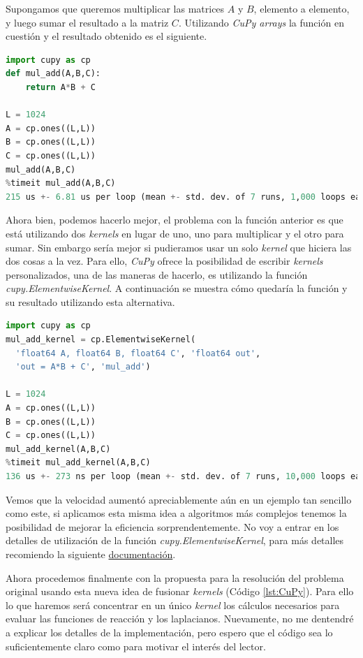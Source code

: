 Supongamos que queremos multiplicar las matrices $A$ y $B$, elemento a elemento, y luego sumar el resultado a la matriz $C$. Utilizando 
\textit{CuPy arrays} la función en cuestión y el resultado obtenido es el siguiente.

\begin{lstlisting}[language=Python,label = {lst:sum_add}]
import cupy as cp
def mul_add(A,B,C):
    return A*B + C

L = 1024
A = cp.ones((L,L))
B = cp.ones((L,L))
C = cp.ones((L,L))
mul_add(A,B,C)
%timeit mul_add(A,B,C)
215 us +- 6.81 us per loop (mean +- std. dev. of 7 runs, 1,000 loops each)
\end{lstlisting}

Ahora bien, podemos hacerlo mejor, el problema con la función anterior es que está utilizando dos \textit{kernels} en lugar de uno, uno para multiplicar 
y el otro para sumar. Sin embargo sería mejor si pudieramos usar un solo \textit{kernel} que hiciera las dos cosas a la vez. Para ello, \textit{CuPy} 
ofrece la posibilidad de escribir \textit{kernels} personalizados, una de las maneras de hacerlo, es utilizando la función \textit{cupy.ElementwiseKernel}.
A continuación se muestra cómo quedaría la función y su resultado utilizando esta alternativa.

\begin{lstlisting}[language=Python,label = {lst:sum_add_kernel}]
import cupy as cp
mul_add_kernel = cp.ElementwiseKernel(
  'float64 A, float64 B, float64 C', 'float64 out',
  'out = A*B + C', 'mul_add')
  
L = 1024
A = cp.ones((L,L))
B = cp.ones((L,L))
C = cp.ones((L,L))
mul_add_kernel(A,B,C)
%timeit mul_add_kernel(A,B,C)
136 us +- 273 ns per loop (mean +- std. dev. of 7 runs, 10,000 loops each)
\end{lstlisting}
Vemos que la velocidad aumentó apreciablemente aún en un ejemplo tan sencillo como este, si aplicamos esta misma idea a algoritmos más 
complejos tenemos la posibilidad de mejorar la eficiencia sorprendentemente. No voy a entrar en los detalles de utilización de la función 
\textit{cupy.ElementwiseKernel}, para más detalles recomiendo la siguiente \href{https://docs.cupy.dev/en/stable/user_guide/kernel.html}{documentación}.

Ahora procedemos finalmente con la propuesta para la resolución del problema original usando esta nueva idea de fusionar \textit{kernels} 
(Código \ref{lst:CuPy}). Para ello lo que haremos será concentrar en un único \textit{kernel} los cálculos necesarios para evaluar las funciones 
de reacción y los laplacianos. Nuevamente, no me dentendré a explicar los detalles de la implementación, pero espero que el código sea lo suficientemente
claro como para motivar el interés del lector.

